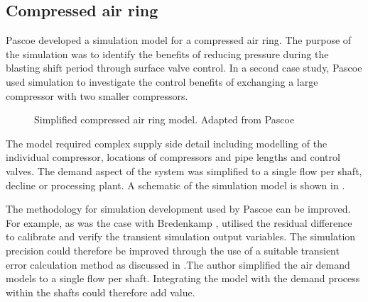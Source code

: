 \subsection{Compressed air ring}
Pascoe \cite{Pascoe2016Masters} developed a simulation model for a compressed air ring. The purpose of the simulation was to identify the benefits of reducing pressure during the blasting shift period through surface valve control. In a second case study, Pascoe used simulation to investigate the control benefits of exchanging a large compressor with two smaller compressors.
\par 
\begin{figure}[!htbp]
	\centering
	\caption[Simplified compressed air ring model]{Simplified compressed air ring model. Adapted from Pascoe \cite{Pascoe2016Masters}}
	\label{fig:Pascoe model}
\end{figure}
 The model required complex supply side detail including modelling of the individual compressor, locations of compressors and pipe lengths and control valves. The demand aspect of the system was simplified to a single flow per shaft, decline or processing plant. A schematic of the simulation model is shown in .
 \par

The methodology for simulation development used by Pascoe can be improved. For example, as was the case with Bredenkamp \cite{Bredenkamp2013Masters}, \cite{Pascoe2016Masters} utilised the residual difference to calibrate and verify the transient simulation output variables. The simulation precision could therefore be improved through the use of a suitable transient error calculation method as discussed in .The author simplified the air demand models to a single flow per shaft. Integrating the model with the demand process within the shafts could therefore add value.


